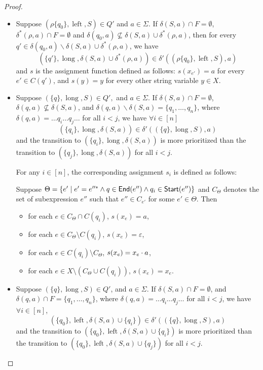 \documentclass[sigplan,review,anonymous]{acmart}\settopmatter{printfolios=true,printccs=false,printacmref=false}
\newcommand{\tmop}[1]{\ensuremath{\operatorname{#1}}}
\newcommand\ssym{{\sf Start}}
\newcommand\esym{{\sf End}}
\begin{document}
\begin{proof}
\begin{itemize}
  \item Suppose $(\rho \{ q_0 \}, \tmop{left}, S) \in Q'$ and $a \in \Sigma$.
  If $\delta (S, a) \cap F = \emptyset$, $\delta^{\ast} (\rho, a) \cap F = \emptyset$
  and $\delta (q_0, a) \nsubseteq \delta (S, a) \cup \delta^{\ast} (\rho, a)$, then
  for every $q' \in \delta (q_0, a) \backslash \delta (S, a) \cup \delta^{\ast}
  (\rho, a)$, we have
  \[ (\{ q' \}, \tmop{long}, \delta (S, a) \cup \delta^{\ast} (\rho, a)) \in \delta'
     ((\rho \{ q_0 \}, \tmop{left}, S), a) \]
  and $s$ is the assignment function defined as follows: $s(x_{e'}) = a$ for every $e'  \in C(q')$, and $s(y)=y$ for every other string variable $y \in X$.
  
  \item Suppose $(\{ q \}, \tmop{long}, S) \in Q',$ and $a \in \Sigma$. If
  $\delta (S, a) \cap F = \emptyset$, $\delta (q, a) \nsubseteq \delta (S,
  a)$, and $\delta (q, a) \backslash \delta (S, a) = \{ q_1, \ldots,
  q_n \}$, where $\delta (q, a) = \ldots q_i \ldots q_j \ldots$ for all $i < j$,
  we have $\forall i \in [n]$
  \[ (\{ q_i \}, \tmop{long}, \delta (S, a)) \in \delta' ((\{ q \},
     \tmop{long}, S), a) \]
  and the transition to $(\{ q_i \}, \tmop{long}, \delta (S, a))$ is more prioritized than the transition to
  $(\{ q_j \}, \tmop{long}, \delta (S, a))$ for all $i < j$. 
  
  For any $i \in [n]$, the corresponding assignment $s_i$ is defined as follows:
  
  Suppose $\Theta = \{e' \mid e' = e''^*  \wedge
  q \in \esym(e'') \wedge q_i \in \ssym(e'') \}$ and $C_{\Theta}$ denotes the set of subexpression $e''$ such that $e'' \in C_{e'}$ for some $e' \in \Theta$.
Then 
\begin{itemize}
\item for each $e \in C_{\Theta} \cap C(q_i)$, $s(x_e) = a$,
%
\item for each $e \in C_{\Theta} \setminus C(q_i)$, $s(x_e) = \varepsilon$, 
%
\item for each $e \in C(q_i) \setminus C_\Theta$, $s(x_e) = x_e \cdot a$,
%
\item for each $e \in X \setminus (C_\Theta \cup C(q_i))$, $s(x_e)= x_e$.
\end{itemize}

    \item Suppose $(\{ q \}, \tmop{long}, S) \in Q'$, and $a \in \Sigma$. If
  $\delta (S, a) \cap F = \emptyset$, and $\delta (q, a) \cap F = \{ q_1,
  \ldots, q_n \}$, where $\delta (q, a) = \ldots q_i \ldots q_j \ldots$ for all
  $i < j$, we have $\forall i \in [n]$,
  \[ (\{ q_0 \}, \tmop{left}, \delta (S, a) \cup \{ q_i \}) \in \delta' ((\{ q
     \}, \tmop{long}, S), a) \]
  and the transition to $(\{ q_0 \}, \tmop{left}, \delta (S, a) \cup \{ q_i \})$ is more
  prioritized than the transition to $(\{ q_0 \}, \tmop{left}, \delta (S, a) \cup \{ q_j \})$
  for all $i < j$.
  

\end{itemize}
\end{proof}
\end{document}
